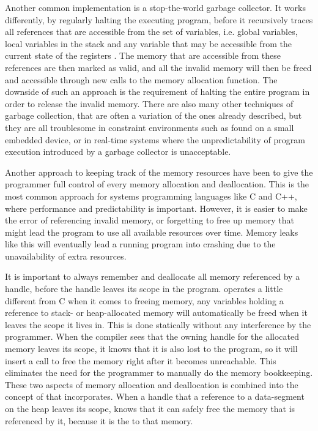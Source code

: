 Another common implementation is a stop-the-world garbage collector.
It works differently, by regularly halting the executing program, before it recursively traces all references that are accessible from the  set of variables, i.e. global variables, local variables in the stack and any variable that may be accessible from the current state of the registers \cite{Wilson1992}.
The memory that are accessible from these references are then marked as valid, and all the invalid memory will then be freed and accessible through new calls to the memory allocation function.
The downside of such an approach is the requirement of halting the entire program in order to release the invalid memory.
There are also many other techniques of garbage collection, that are often a variation of the ones already described, but they are all troublesome in constraint environments such as found on a small embedded device, or in real-time systems where the unpredictability of program execution introduced by a garbage collector is unacceptable.

Another approach to keeping track of the memory resources have been to give the programmer full control of every memory allocation and deallocation.
This is the most common approach for systems programming languages like C and C++, where performance and predictability is important.
However, it is easier to make the error of referencing invalid memory, or forgetting to free up memory that might lead the program to use all available resources over time.
Memory leaks like this will eventually lead a running program into crashing due to the unavailability of extra resources.


It is important to always remember and deallocate all memory referenced by a handle, before the handle leaves its scope in the program.
\rust operates a little different from C when it comes to freeing memory, any variables holding a reference to stack- or heap-allocated memory will automatically be freed when it leaves the scope it lives in.
This is done statically without any interference by the programmer.
When the compiler sees that the owning handle for the allocated memory leaves its scope, it knows that it is also lost to the program, so it will insert a call to free the memory right after it becomes unreachable.
This eliminates the need for the programmer to manually do the memory bookkeeping.
These two aspects of memory allocation and deallocation is combined into the concept of  that \rust incorporates.
When a handle that  a reference to a data-segment on the heap leaves its scope, \rust knows that it can safely free the memory that is referenced by it, because it is the  to that memory.

